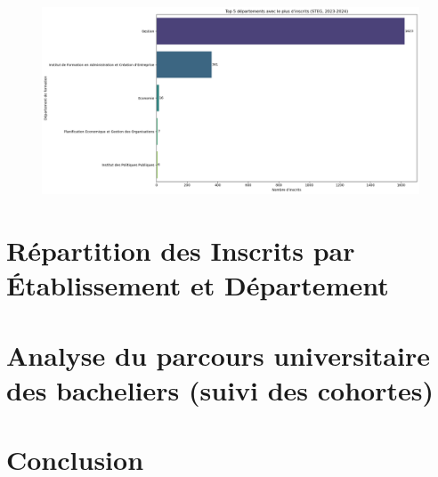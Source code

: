 \begin{figure}
\centering
\includegraphics[width=1\textwidth]{figure/dep_STEG_2024.png}
\end{figure}

\section{Répartition des Inscrits par Établissement et Département}

\section{Analyse du parcours universitaire des bacheliers (suivi des cohortes)}

\section{Conclusion}